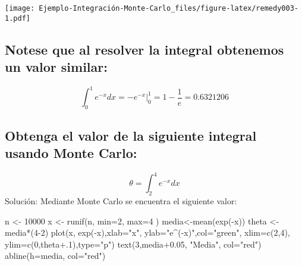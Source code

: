 \documentclass[
]{article}
\newenvironment{Shaded}{\begin{snugshade}}{\end{snugshade}}
\newcommand{\AttributeTok}[1]{\textcolor[rgb]{0.77,0.63,0.00}{#1}}
\newcommand{\DecValTok}[1]{\textcolor[rgb]{0.00,0.00,0.81}{#1}}
\newcommand{\FloatTok}[1]{\textcolor[rgb]{0.00,0.00,0.81}{#1}}
\newcommand{\FunctionTok}[1]{\textcolor[rgb]{0.00,0.00,0.00}{#1}}
\newcommand{\NormalTok}[1]{#1}
\newcommand{\OtherTok}[1]{\textcolor[rgb]{0.56,0.35,0.01}{#1}}
\newcommand{\SpecialCharTok}[1]{\textcolor[rgb]{0.00,0.00,0.00}{#1}}
\newcommand{\StringTok}[1]{\textcolor[rgb]{0.31,0.60,0.02}{#1}}
\begin{document}
\texttt{[image: Ejemplo-Integración-Monte-Carlo\_files/figure-latex/remedy003-1.pdf]}

\hypertarget{notese-que-al-resolver-la-integral-obtenemos-un-valor-similar}{%
\subsection{Notese que al resolver la integral obtenemos un valor
similar:}\label{notese-que-al-resolver-la-integral-obtenemos-un-valor-similar}}

\[
\int_0^1 e^{-x} d x=-e^{-x}\Big|_0^1=1-\frac{1}{e}= 0.6321206
\]

\newpage

\hypertarget{obtenga-el-valor-de-la-siguiente-integral-usando-monte-carlo}{%
\subsection{Obtenga el valor de la siguiente integral usando Monte
Carlo:}\label{obtenga-el-valor-de-la-siguiente-integral-usando-monte-carlo}}

\[
\theta=\int_2^4 e^{-x} d x
\] Solución: Mediante Monte Carlo se encuentra el siguiente valor:

\begin{Shaded}
\begin{Highlighting}[]
\NormalTok{n }\OtherTok{\textless{}{-}} \DecValTok{10000}
\NormalTok{x }\OtherTok{\textless{}{-}} \FunctionTok{runif}\NormalTok{(n, }\AttributeTok{min=}\DecValTok{2}\NormalTok{, }\AttributeTok{max=}\DecValTok{4}\NormalTok{ )}
\NormalTok{media}\OtherTok{\textless{}{-}}\FunctionTok{mean}\NormalTok{(}\FunctionTok{exp}\NormalTok{(}\SpecialCharTok{{-}}\NormalTok{x))}
\NormalTok{theta }\OtherTok{\textless{}{-}}\NormalTok{ media}\SpecialCharTok{*}\NormalTok{(}\DecValTok{4{-}2}\NormalTok{)}
\FunctionTok{plot}\NormalTok{(x, }\FunctionTok{exp}\NormalTok{(}\SpecialCharTok{{-}}\NormalTok{x),}\AttributeTok{xlab=}\StringTok{"x"}\NormalTok{, }\AttributeTok{ylab=}\StringTok{"e\^{}({-}x)"}\NormalTok{,}\AttributeTok{col=}\StringTok{"green"}\NormalTok{, }
     \AttributeTok{xlim=}\FunctionTok{c}\NormalTok{(}\DecValTok{2}\NormalTok{,}\DecValTok{4}\NormalTok{), }\AttributeTok{ylim=}\FunctionTok{c}\NormalTok{(}\DecValTok{0}\NormalTok{,theta}\FloatTok{+.1}\NormalTok{),}\AttributeTok{type=}\StringTok{"p"}\NormalTok{)}
\FunctionTok{text}\NormalTok{(}\DecValTok{3}\NormalTok{,media}\FloatTok{+0.05}\NormalTok{, }\StringTok{"Media"}\NormalTok{, }\AttributeTok{col=}\StringTok{"red"}\NormalTok{)}
\FunctionTok{abline}\NormalTok{(}\AttributeTok{h=}\NormalTok{media, }\AttributeTok{col=}\StringTok{"red"}\NormalTok{)}
\end{Highlighting}
\end{Shaded}
\end{document}
